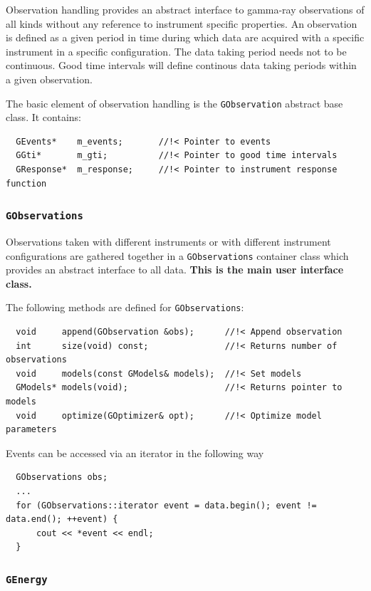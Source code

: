\documentclass{article}[12pt,a4]
\begin{document}
Observation handling provides an abstract interface to gamma-ray observations of all kinds
without any reference to instrument specific properties.
An observation is defined as a given period in time during which data are acquired with a
specific instrument in a specific configuration.
The data taking period needs not to be continuous.
Good time intervals will define continous data taking periods within a given observation.

The basic element of observation handling is the {\tt GObservation} abstract base class.
It contains:
\begin{verbatim}
  GEvents*    m_events;       //!< Pointer to events
  GGti*       m_gti;          //!< Pointer to good time intervals
  GResponse*  m_response;     //!< Pointer to instrument response function
\end{verbatim}


\subsubsection{{\tt GObservations}}

Observations taken with different instruments or with different instrument configurations are
gathered together in a {\tt GObservations} container class which provides an abstract interface 
to all data.
{\bf This is the main user interface class.}

The following methods are defined for {\tt GObservations}:
\begin{verbatim}
  void     append(GObservation &obs);      //!< Append observation
  int      size(void) const;               //!< Returns number of observations
  void     models(const GModels& models);  //!< Set models
  GModels* models(void);                   //!< Returns pointer to models
  void     optimize(GOptimizer& opt);      //!< Optimize model parameters
\end{verbatim}

Events can be accessed via an iterator in the following way
\begin{verbatim}
  GObservations obs;
  ...
  for (GObservations::iterator event = data.begin(); event != data.end(); ++event) {
      cout << *event << endl;
  }
\end{verbatim}


\subsubsection{{\tt GEnergy}}
\end{document}
